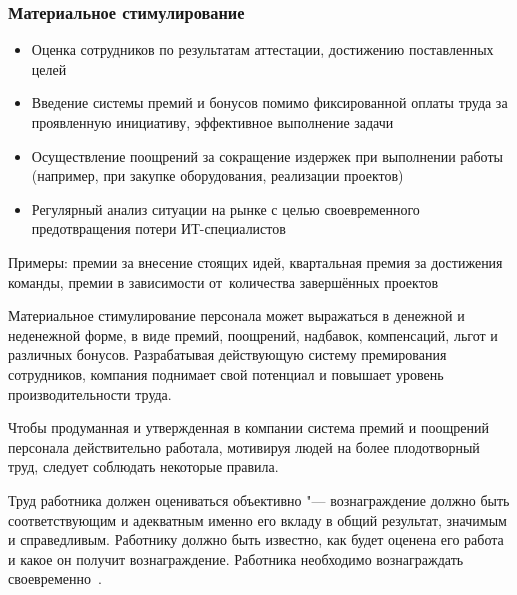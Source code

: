 \documentclass{../industrial-development}
\begin{document}
\begin{frame} \frametitle{Материальное стимулирование}

	 \begin{itemize}
	\item Оценка сотрудников по результатам аттестации, достижению поставленных целей
	\item Введение системы премий и бонусов помимо фиксированной оплаты труда за проявленную инициативу, эффективное выполнение задачи
	\item  Осуществление поощрений за сокращение издержек при выполнении работы (например, при закупке оборудования, реализации проектов)
	 \item  Регулярный анализ ситуации на рынке с целью своевременного предотвращения потери ИТ-специалистов
	 \end{itemize}
		Примеры: премии за внесение стоящих идей, квартальная премия за достижения команды, премии в зависимости от~количества завершённых проектов
\end{frame}
\lecturenotes

Материальное стимулирование персонала может выражаться в денежной и неденежной форме, в виде премий, поощрений, надбавок, компенсаций, льгот и различных бонусов. Разрабатывая действующую систему премирования сотрудников, компания поднимает свой потенциал и повышает уровень производительности труда.

Чтобы продуманная и утвержденная в компании система премий и поощрений персонала действительно работала, мотивируя людей на более плодотворный труд, следует соблюдать некоторые правила.

Труд работника должен оцениваться объективно "--- вознаграждение должно быть соответствующим и адекватным именно его вкладу в общий результат, значимым и справедливым. Работнику должно быть известно, как будет оценена его работа и какое он получит вознаграждение. Работника необходимо вознаграждать своевременно~\cite{MotivPerson}.
\end{document}
